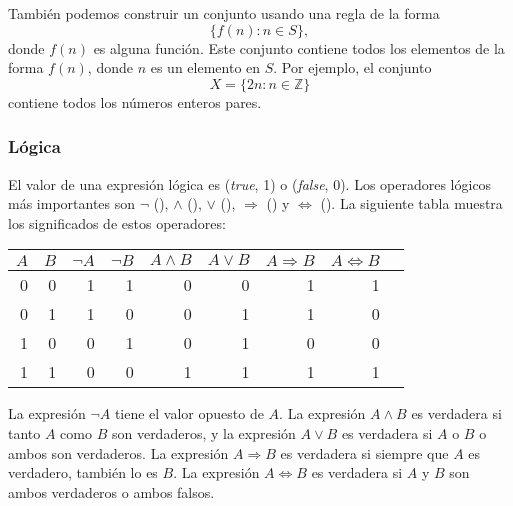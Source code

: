 También podemos construir un conjunto usando una regla de la forma
\[\{f(n) : n \in S\},\]
donde $f(n)$ es alguna función.
Este conjunto contiene todos los elementos de la forma $f(n)$,
donde $n$ es un elemento en $S$.
Por ejemplo, el conjunto
\[X=\{2n : n \in \mathbb{Z}\}\]
contiene todos los números enteros pares.

\subsubsection{Lógica}


El valor de una expresión lógica es
 (\textit{true}, 1) o  (\textit{false}, 0).
Los operadores lógicos más importantes son
$\lnot$ (),
$\land$ (),
$\lor$ (),
$\Rightarrow$ () y
$\Leftrightarrow$ ().
La siguiente tabla muestra los significados de estos operadores:

\begin{center}
    \begin{tabular}{rr|rrrrrrr}
        $A$ & $B$ & $\lnot A$ & $\lnot B$ & $A \land B$ & $A \lor B$ & $A \Rightarrow B$ & $A \Leftrightarrow B$ \\
        \hline
        0   & 0   & 1         & 1         & 0           & 0          & 1                 & 1                     \\
        0   & 1   & 1         & 0         & 0           & 1          & 1                 & 0                     \\
        1   & 0   & 0         & 1         & 0           & 1          & 0                 & 0                     \\
        1   & 1   & 0         & 0         & 1           & 1          & 1                 & 1                     \\
    \end{tabular}
\end{center}

La expresión $\lnot A$ tiene el valor opuesto de $A$.
La expresión $A \land B$ es verdadera si tanto $A$ como $B$
son verdaderos,
y la expresión $A \lor B$ es verdadera si $A$ o $B$ o ambos
son verdaderos.
La expresión $A \Rightarrow B$ es verdadera
si siempre que $A$ es verdadero, también lo es $B$.
La expresión $A \Leftrightarrow B$ es verdadera
si $A$ y $B$ son ambos verdaderos o ambos falsos.

